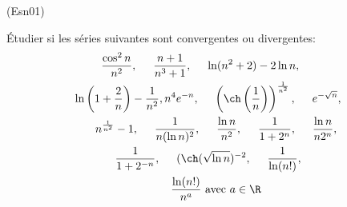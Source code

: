 \begin{tiny}(Esn01)\end{tiny} \'Etudier si les séries suivantes sont convergentes ou divergentes:
\begin{multline*}
  \frac{\cos^2 n}{n^2},\hspace{0.5cm}\frac{n+1}{n^3+1},\hspace{0.5cm}\ln(n^2+2)-2\ln n,\hspace{0.5cm}\\ \ln\left( 1+\frac{2}{n}\right)-\frac{1}{n^2},
  n^4e^{-n},\hspace{0.5cm}
\left( \ch\left( \frac{1}{n}\right) \right)^{\frac{1}{n^2}},\hspace{0.5cm} e^{-\sqrt{n}},\\
\hspace{0.5cm} n^{\frac{1}{n^{2}}}-1,\hspace{0.5cm}\frac{1}{n(\ln n)^2},\hspace{0.5cm} \frac{\ln n}{n^2}
,\hspace{0.5cm} \frac{1}{1+ 2^n},\hspace{0.5cm} \frac{\ln n}{n 2^n}, \\
\frac{1}{1+2^{-n}},\hspace{0.5cm} (\ch(\sqrt{\ln n})^{-2},\hspace{0.5cm}\frac{1}{\ln(n!)}, \\
\hspace{0.5cm} \frac{\ln(n!)}{n^a} \text{ avec }a\in \R
\end{multline*}
